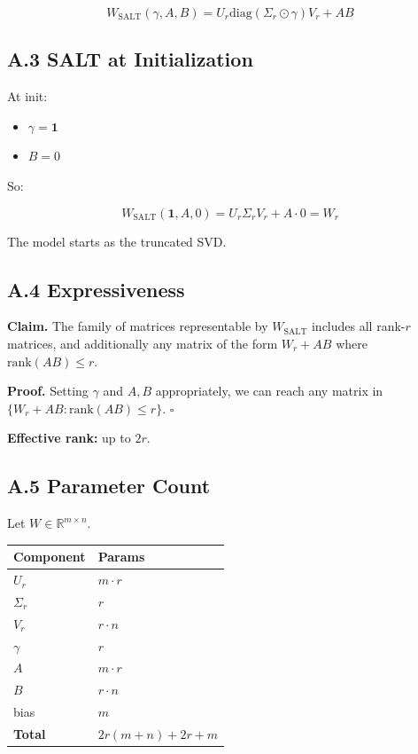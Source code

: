 \[
W_\text{SALT}(\gamma, A, B) = U_r \text{diag}(\Sigma_r \odot \gamma) V_r + AB
\tag{A.2}
\]

\subsection{A.3 SALT at Initialization}

At init:

\begin{itemize}
\item $\gamma = \mathbf{1}$
\item $B = 0$

\end{itemize}
So:

\[
W_\text{SALT}(\mathbf{1}, A, 0) = U_r \Sigma_r V_r + A \cdot 0 = W_r
\tag{A.3}
\]

The model starts as the truncated SVD.

\subsection{A.4 Expressiveness}

\textbf{Claim.} The family of matrices representable by $W_\text{SALT}$ includes 
all rank-$r$ matrices, and additionally any matrix of the form 
$W_r + AB$ where $\text{rank}(AB) \leq r$.

\textbf{Proof.} Setting $\gamma$ and $A, B$ appropriately, we can reach any 
matrix in $\{W_r + AB : \text{rank}(AB) \leq r\}$. $\square$

\textbf{Effective rank:} up to $2r$.

\subsection{A.5 Parameter Count}

Let $W \in \mathbb{R}^{m \times n}$.

\begin{table}[H]
\centering
\small
\begin{tabular}{ll}
\toprule
\textbf{Component} & \textbf{Params} \\
\midrule
$U_r$ & $m \cdot r$ \\
$\Sigma_r$ & $r$ \\
$V_r$ & $r \cdot n$ \\
$\gamma$ & $r$ \\
$A$ & $m \cdot r$ \\
$B$ & $r \cdot n$ \\
bias & $m$ \\
\textbf{Total} & $2r(m + n) + 2r + m$ \\
\bottomrule
\end{tabular}
\end{table}

